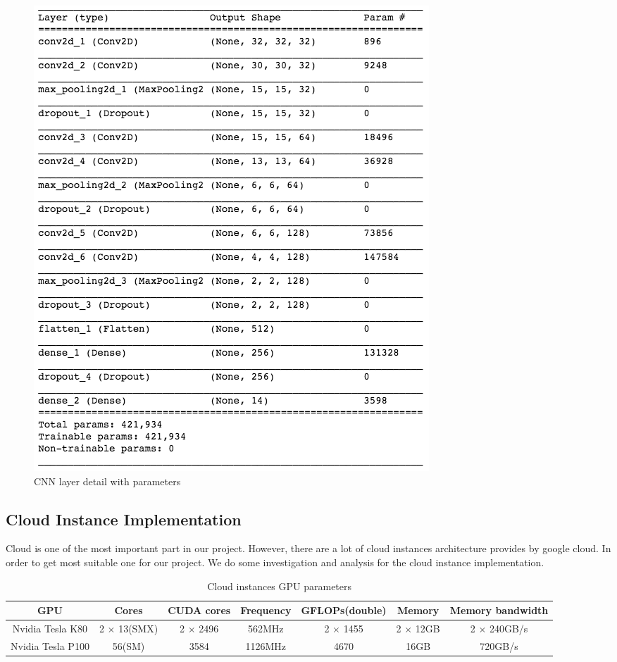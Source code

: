 \documentclass[conference]{IEEEtran}
\begin{document}
\begin{figure}[H]
\centering
  \begin{minipage}{.4\textwidth}
    \centering
    \includegraphics[width=0.8\linewidth]{archi_param.png}
    \caption{CNN layer detail with parameters}
    \label{fig:fig_1}
  \end{minipage}
\end{figure}


\subsection{Cloud Instance Implementation}

Cloud is one of the most important part in our project. However, there are a lot of cloud instances architecture provides by google cloud. In order to get most suitable one for our project. We do some investigation and analysis for the cloud instance implementation.

\begin{table}
\caption{Cloud instances GPU parameters}
\centering
\begin{tabular}{|c|c|c|c|c|c|c|}
\hline
\textbf{GPU} & \textbf{Cores} & \textbf{CUDA cores} & \textbf{Frequency} & \textbf{GFLOPs(double)} & \textbf{Memory} & \textbf{Memory bandwidth}\\
\hline
Nvidia Tesla K80 & 2 $\times$ 13(SMX) & 2 $\times$ 2496 & 562MHz & 2 $\times$ 1455 & 2 $\times$ 12GB & 2 $\times$ 240GB/s \\
\hline
Nvidia Tesla P100 & 56(SM) & 3584 & 1126MHz & 4670 & 16GB & 720GB/s\\
\hline
\end{tabular}
\end{table}
\end{document}
